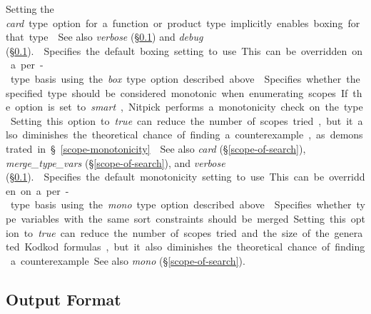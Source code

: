 \documentclass[a4paper,12pt]{article}
\begin{document}
\begin{enum}
Setting the \textit{card}~\qty{type} option for a function or product type
implicitly enables boxing for that type.

\nopagebreak
{\small See also \textit{verbose} (\S\ref{output-format})
and \textit{debug} (\S\ref{output-format}).}

Specifies the default boxing setting to use. This can be overridden on a
per-type basis using the \textit{box}~\qty{type} option described above.

Specifies whether the specified type should be considered monotonic when
enumerating scopes. If the option is set to \textit{smart}, Nitpick performs a
monotonicity check on the type. Setting this option to \textit{true} can reduce
the number of scopes tried, but it also diminishes the theoretical chance of
finding a counterexample, as demonstrated in \S\ref{scope-monotonicity}.

\nopagebreak
{\small See also \textit{card} (\S\ref{scope-of-search}),
\textit{merge\_type\_vars} (\S\ref{scope-of-search}), and \textit{verbose}
(\S\ref{output-format}).}

Specifies the default monotonicity setting to use. This can be overridden on a
per-type basis using the \textit{mono}~\qty{type} option described above.

Specifies whether type variables with the same sort constraints should be
merged. Setting this option to \textit{true} can reduce the number of scopes
tried and the size of the generated Kodkod formulas, but it also diminishes the
theoretical chance of finding a counterexample.

{\small See also \textit{mono} (\S\ref{scope-of-search}).}
\end{enum}

\subsection{Output Format}
\label{output-format}
\end{document}
